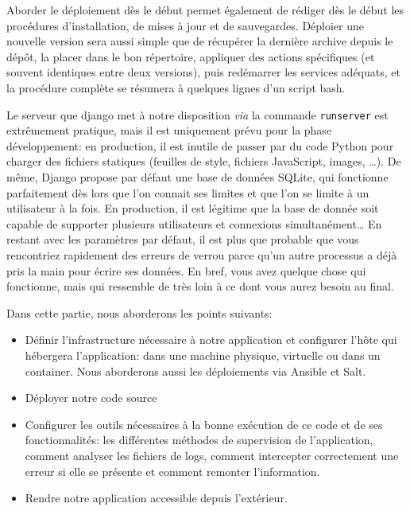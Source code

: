 \documentclass[11pt]{amsbook}
\begin{document}
Aborder le déploiement dès le début permet également de rédiger dès le début les procédures d’installation, de mises à jour et de sauvegardes.
Déploier une nouvelle version sera aussi simple que de récupérer la dernière archive depuis le dépôt, la placer dans le bon répertoire, appliquer des actions spécifiques (et souvent identiques entre deux versions), puis redémarrer les services adéquats, et la procédure complète se résumera à quelques lignes d’un script bash.


Le serveur que django met à notre disposition \emph{via} la commande \texttt{runserver} est extrêmement pratique, mais il est uniquement prévu pour la phase  développement: en production, il est inutile de passer par du code Python pour charger des fichiers statiques (feuilles de style, fichiers JavaScript, images, …​).
De même, Django propose par défaut une base de données SQLite, qui fonctionne parfaitement dès lors que l’on connait ses limites et que l’on se limite à un utilisateur à la fois. En production, il est légitime que la base de donnée soit capable de supporter plusieurs utilisateurs et connexions simultanément…​
En restant avec les paramètres par défaut, il est plus que probable que vous rencontriez rapidement des erreurs de verrou parce qu’un autre processus a déjà pris la main pour écrire ses données.
En bref, vous avez quelque chose qui fonctionne, mais qui ressemble de très loin à ce dont vous aurez besoin au final.


Dans cette partie, nous aborderons les points suivants:


\begin{itemize}

\item Définir l’infrastructure nécessaire à notre application et configurer l’hôte qui hébergera l’application: dans une machine physique, virtuelle ou dans un container. Nous aborderons aussi les déploiements via Ansible et Salt.

\item Déployer notre code source

\item Configurer les outils nécessaires à la bonne exécution de ce code et de ses fonctionnalités: les différentes méthodes de supervision de l’application, comment analyser les fichiers de logs, comment intercepter correctement une erreur si elle se présente et comment remonter l’information.

\item Rendre notre application accessible depuis l’extérieur.

\end{itemize}
\end{document}
